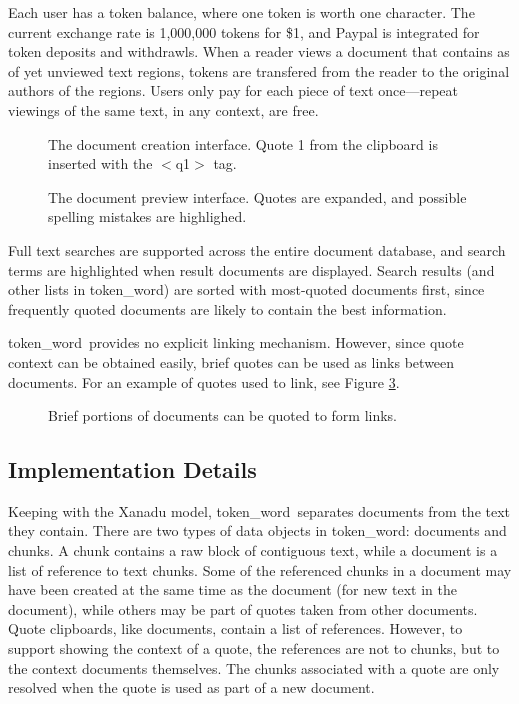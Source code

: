 \documentclass{acm_proc_article-sp}
\newcommand{\tw}{token\_word}
\begin{document}
Each user has a token balance, where one token is worth one character.
The current exchange rate is 1,000,000 tokens for \$1, and Paypal is integrated for token deposits and withdrawls.
When a reader views a document that contains as of yet unviewed text regions, tokens are transfered from the reader to the original authors of the regions.
Users only pay for each piece of text once---repeat viewings of the same text, in any context, are free.
\begin{figure}[t]
\centering
{}
\caption{The document creation interface. Quote 1 from the clipboard is inserted with the $<$q1$>$ tag.}
\label{fig:docCreate}
\end{figure}

\begin{figure}[t]
\centering
{}
\caption{The document preview interface.  Quotes are expanded, and possible spelling mistakes are highlighed.}
\label{fig:docPreview}
\end{figure}

Full text searches are supported across the entire document database, and search terms are highlighted when result documents are displayed.
Search results (and other lists in \tw) are sorted with most-quoted documents first, since frequently quoted documents are likely to contain the best information. 

\tw \ provides no explicit linking mechanism.
However, since quote context can be obtained easily, brief quotes can be used as links between documents.
For an example of quotes used to link, see Figure \ref{fig:quotesAsLinks}.

\begin{figure}[t]
\centering
{}
\caption{Brief portions of documents can be quoted to form links.}
\label{fig:quotesAsLinks}
\end{figure}

\subsection{Implementation Details}

Keeping with the Xanadu model, \tw \ separates documents from the text they contain.
There are two types of data objects in \tw:  documents and chunks.
A chunk contains a raw block of contiguous text, while a document is a list of reference to text chunks.
Some of the referenced chunks in a document may have been created at the same time as the document (for new text in the document), while others may be part of quotes taken from other documents.
Quote clipboards, like documents, contain a list of references.
However, to support showing the context of a quote, the references are not to chunks, but to the context documents themselves.
The chunks associated with a quote are only resolved when the quote is used as part of a new document.
\end{document}
